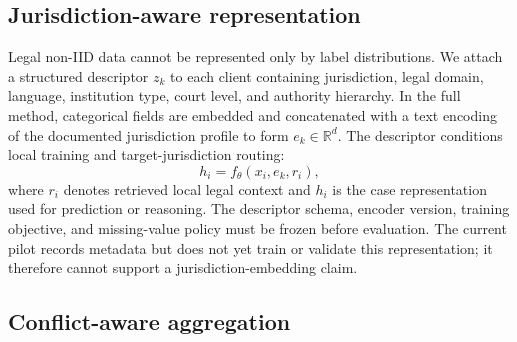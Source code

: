 \documentclass[preprint,12pt,authoryear]{elsarticle}
\begin{document}
\subsection{Jurisdiction-aware representation}

Legal non-IID data cannot be represented only by label distributions. We attach a structured descriptor $z_k$ to each client containing jurisdiction, legal domain, language, institution type, court level, and authority hierarchy. In the full method, categorical fields are embedded and concatenated with a text encoding of the documented jurisdiction profile to form $e_k \in \mathbb{R}^{d}$. The descriptor conditions local training and target-jurisdiction routing:
\begin{equation}
    h_i = f_{\theta}(x_i, e_k, r_i),
\end{equation}
where $r_i$ denotes retrieved local legal context and $h_i$ is the case representation used for prediction or reasoning.
The descriptor schema, encoder version, training objective, and missing-value policy must be frozen before evaluation. The current pilot records metadata but does not yet train or validate this representation; it therefore cannot support a jurisdiction-embedding claim.

\subsection{Conflict-aware aggregation}
\end{document}
